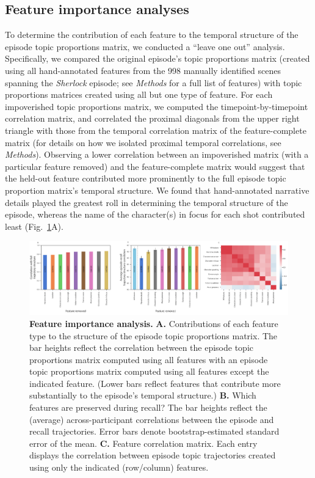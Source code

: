 \documentclass{article}
\begin{document}
\subsection*{Feature importance analyses}
To determine the contribution of each feature to the temporal structure of the episode topic proportions matrix, we conducted a ``leave one out'' analysis.  Specifically, we compared the original episode's topic proportions matrix (created using all hand-annotated features from the 998 manually identified scenes spanning the \textit{Sherlock} episode; see \textit{Methods} for a full list of features) with topic proportions matrices created using all but one type of feature.  For each impoverished topic proportions matrix, we computed the timepoint-by-timepoint correlation matrix, and correlated the proximal diagonals from the upper right triangle with those from the temporal correlation matrix of the feature-complete matrix (for details on how we isolated proximal temporal correlations, see \textit{Methods}).  Observing a lower correlation between an impoverished matrix (with a particular feature removed) and the feature-complete matrix would suggest that the held-out feature contributed more prominently to the full episode topic proportion matrix's temporal structure.  We found that hand-annotated narrative details played the greatest roll in determining the temporal structure of the episode, whereas the name of the character(s) in focus for each shot contributed least (Fig.~\ref{fig:feature-importance}A).

\begin{figure}[]
\centering
\includegraphics[width=1\textwidth]{figs/feature_value}
\caption{\small \textbf{Feature importance analysis.} \textbf{A.} Contributions of each feature type to the structure of the episode topic proportions matrix. The bar heights reflect the correlation between the episode topic proportions matrix computed using all features with an episode topic proportions matrix computed using all features except the indicated feature.  (Lower bars reflect features that contribute more substantially to the episode's temporal structure.) \textbf{B.} Which features are preserved during recall?  The bar heights reflect the (average) across-participant correlations between the episode and recall trajectories.  Error bars denote bootstrap-estimated standard error of the mean.  \textbf{C.} Feature correlation matrix.  Each entry displays the correlation between episode topic trajectories created using only the indicated (row/column) features.}
\label{fig:feature-importance}
\end{figure}
\end{document}

